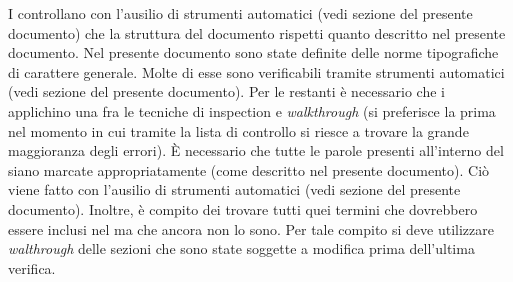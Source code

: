 						I  controllano con l'ausilio di strumenti automatici (vedi sezione  del presente documento) che la struttura del documento rispetti quanto descritto nel presente documento.
						Nel presente documento sono state definite delle norme tipografiche di carattere generale. Molte di esse sono verificabili tramite strumenti automatici (vedi sezione  del presente documento). Per le restanti è necessario che i  applichino una fra le tecniche di inspection e \textit{walkthrough}	(si preferisce la prima nel momento in cui tramite la lista di controllo si riesce a trovare la grande maggioranza degli errori).
						È necessario che tutte le parole presenti all'interno del  siano marcate appropriatamente (come descritto nel presente documento). Ciò viene fatto con l'ausilio di strumenti automatici (vedi sezione  del presente documento). Inoltre, è compito dei  trovare tutti quei termini che dovrebbero essere inclusi nel  ma che ancora non lo sono. Per tale compito si deve utilizzare \textit{walthrough} delle sezioni che sono state soggette a modifica prima dell'ultima verifica.

